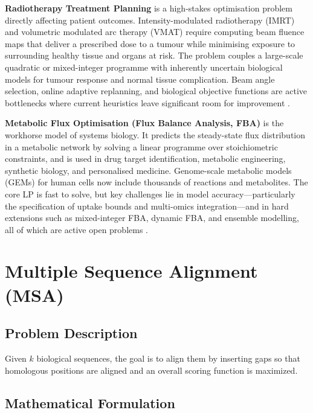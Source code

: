 \documentclass[11pt]{article}
\begin{document}
\textbf{Radiotherapy Treatment Planning} is a high-stakes optimisation problem
directly affecting patient outcomes. Intensity-modulated radiotherapy (IMRT) and
volumetric modulated arc therapy (VMAT) require computing beam fluence maps that
deliver a prescribed dose to a tumour while minimising exposure to surrounding healthy
tissue and organs at risk. The problem couples a large-scale quadratic or
mixed-integer programme with inherently uncertain biological models for tumour response
and normal tissue complication. Beam angle selection, online adaptive replanning,
and biological objective functions are active bottlenecks where current heuristics
leave significant room for improvement \cite{Bortfeld2006,Craft2007}.
\medskip

\textbf{Metabolic Flux Optimisation (Flux Balance Analysis, FBA)} is the workhorse
model of systems biology. It predicts the steady-state flux distribution in a metabolic
network by solving a linear programme over stoichiometric constraints, and is used
in drug target identification, metabolic engineering, synthetic biology, and
personalised medicine. Genome-scale metabolic models (GEMs) for human cells now
include thousands of reactions and metabolites. The core LP is fast to solve, but
key challenges lie in model accuracy---particularly the specification of uptake bounds
and multi-omics integration---and in hard extensions such as mixed-integer FBA,
dynamic FBA, and ensemble modelling, all of which are active open problems
\cite{VarmaPalsson1994,Orth2010}.

\newpage

\section{Multiple Sequence Alignment (MSA)}

\subsection*{Problem Description}

Given $k$ biological sequences, the goal is to align them by inserting gaps so that
homologous positions are aligned and an overall scoring function is maximized.

\subsection*{Mathematical Formulation}
\end{document}
